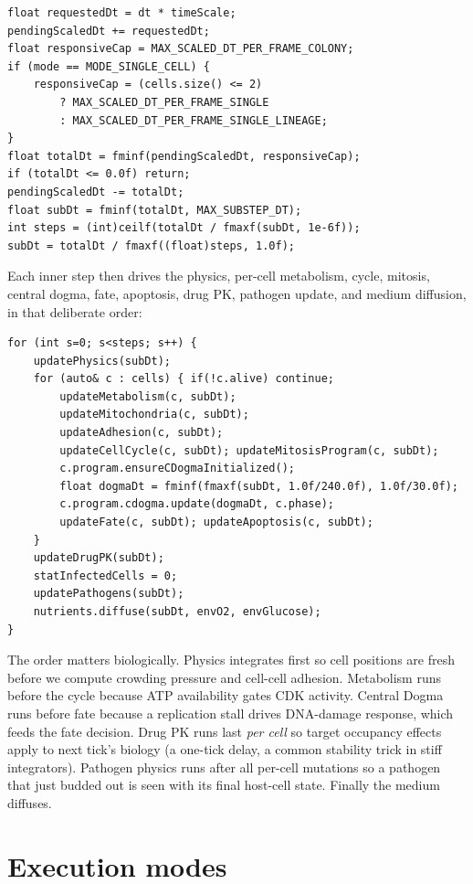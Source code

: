 \documentclass[11pt,letterpaper,twoside,openany]{book}
\begin{document}
\begin{lstlisting}
float requestedDt = dt * timeScale;
pendingScaledDt += requestedDt;
float responsiveCap = MAX_SCALED_DT_PER_FRAME_COLONY;
if (mode == MODE_SINGLE_CELL) {
    responsiveCap = (cells.size() <= 2)
        ? MAX_SCALED_DT_PER_FRAME_SINGLE
        : MAX_SCALED_DT_PER_FRAME_SINGLE_LINEAGE;
}
float totalDt = fminf(pendingScaledDt, responsiveCap);
if (totalDt <= 0.0f) return;
pendingScaledDt -= totalDt;
float subDt = fminf(totalDt, MAX_SUBSTEP_DT);
int steps = (int)ceilf(totalDt / fmaxf(subDt, 1e-6f));
subDt = totalDt / fmaxf((float)steps, 1.0f);
\end{lstlisting}

Each inner step then drives the physics, per-cell metabolism, cycle,
mitosis, central dogma, fate, apoptosis, drug PK, pathogen update,
and medium diffusion, in that deliberate order:

\begin{lstlisting}
for (int s=0; s<steps; s++) {
    updatePhysics(subDt);
    for (auto& c : cells) { if(!c.alive) continue;
        updateMetabolism(c, subDt);
        updateMitochondria(c, subDt);
        updateAdhesion(c, subDt);
        updateCellCycle(c, subDt); updateMitosisProgram(c, subDt);
        c.program.ensureCDogmaInitialized();
        float dogmaDt = fminf(fmaxf(subDt, 1.0f/240.0f), 1.0f/30.0f);
        c.program.cdogma.update(dogmaDt, c.phase);
        updateFate(c, subDt); updateApoptosis(c, subDt);
    }
    updateDrugPK(subDt);
    statInfectedCells = 0;
    updatePathogens(subDt);
    nutrients.diffuse(subDt, envO2, envGlucose);
}
\end{lstlisting}

The order matters biologically. Physics integrates first so cell
positions are fresh before we compute crowding pressure and cell-cell
adhesion. Metabolism runs before the cycle because ATP availability
gates CDK activity. Central Dogma runs before fate because a
replication stall drives DNA-damage response, which feeds the fate
decision. Drug PK runs last \emph{per cell} so target occupancy
effects apply to next tick's biology (a one-tick delay, a common
stability trick in stiff integrators). Pathogen physics runs after
all per-cell mutations so a pathogen that just budded out is seen
with its final host-cell state. Finally the medium diffuses.

\section{Execution modes}
\label{sec:modes}
\end{document}
